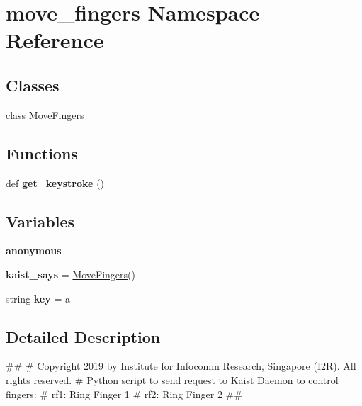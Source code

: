 \hypertarget{namespacemove__fingers}{}\section{move\+\_\+fingers Namespace Reference}
\label{namespacemove__fingers}
\subsection*{Classes}
\begin{DoxyCompactItemize}
\item 
class \hyperlink{classmove__fingers_1_1MoveFingers}{Move\+Fingers}
\end{DoxyCompactItemize}
\subsection*{Functions}
\begin{DoxyCompactItemize}
\item 
\mbox{\label{namespacemove__fingers_a829a5cdfa7cef1cfeaa052608324cb3c}} 
def {\bfseries get\+\_\+keystroke} ()
\end{DoxyCompactItemize}
\subsection*{Variables}
\begin{DoxyCompactItemize}
\item 
\mbox{\label{namespacemove__fingers_a7de5f7a69940214a673705afe00d7e98}} 
{\bfseries anonymous}
\item 
\mbox{\label{namespacemove__fingers_a818d6ee10f90f8627ac4a18955256181}} 
{\bfseries kaist\+\_\+says} = \hyperlink{classmove__fingers_1_1MoveFingers}{Move\+Fingers}()
\item 
\mbox{\label{namespacemove__fingers_a1b82203ec0d5d34671488740b48ccbc7}} 
string {\bfseries key} = \textquotesingle{}a\textquotesingle{}
\end{DoxyCompactItemize}


\subsection{Detailed Description}
\begin{DoxyVerb}##
#  Copyright 2019 by Institute for Infocomm Research, Singapore (I2R). All rights reserved.
#  Python script to send request to Kaist Daemon to control fingers:
#  rf1: Ring Finger 1
#  rf2: Ring Finger 2
##
\end{DoxyVerb}
 
